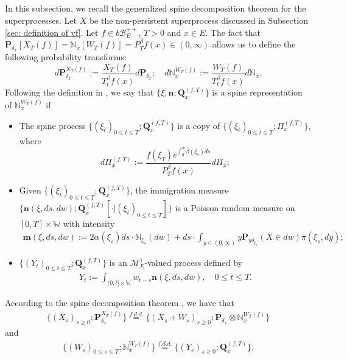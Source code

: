 \documentclass[12pt,oneside,english]{amsart}
\theoremstyle{plain}
\theoremstyle{definition}
\numberwithin{equation}{section}
\newcommand{\added}[1]{{\color{blue}#1}}\newcommand{\deleted}[1]{{\color{red}#1}}
\begin{document}
\subsection{}
    \added{ In this subsection, we recall the generalized spine decomposition theorem for the superprocesses.}
    Let $X$ be the non-persistent superprocess discussed in Subsection \ref{sec: definition of vf}.
    Let $f\in b\mathscr B_E^{++}$, $T >0$ and $x\in E$.
    The fact that $\mathbf P_{\delta_x}[X_T(f)] = \mathbb N_x[W_T(f)] = P^\beta_T f(x) \in (0,\infty)$ allows us to define the following probability transforms:
\begin{equation}
    d\mathbf P_{\delta_x}^{X_T(f)}
    := \frac{X_T(f)}{T_t^\beta f(x)} d\mathbf P_{\delta_x};
    \quad d\mathbb N_x^{W_T(f)}
    :=  \frac{W_T(f)}{T_t^\beta f(x)} d\mathbb N_x.
\end{equation}
    Following the definition in \cite{RenSongSun2017Spine}, we say that $\{\xi, \mathbf n;\mathbf Q_{x}^{(f,T)}\}$ is a spine representation of $\mathbb N_x^{W_T(f)}$ if
\begin{itemize}
\item
    The spine process $\{(\xi_t)_{0\leq t\leq T}; \mathbf Q^{(f,T)}_x\}$ is a copy of $\{(\xi_t)_{0\leq t\leq T}; \Pi^{(f,T)}_{x}\}$,
    where
\begin{equation}
    d\Pi_x^{(f,T)} := \frac{f(\xi_T)e^{\int_0^T \beta(\xi_s)ds}}{P^\beta_T f(x)} d \Pi_x;
\end{equation}
\item
    Given $\{(\xi_t)_{0\leq t\leq T}; \mathbf Q^{(f,T)}_x\}$, the immigration measure $\{\mathbf n(\xi,ds,dw); \mathbf Q^{(f,T)}_x[\cdot |(\xi_t)_{0\leq t\leq T}]\}$ is a Poisson random measure on $[0,T] \times \mathbb W$ with intensity
\begin{align}
    \mathbf m(\xi,ds,dw)
    := 2 \alpha(\xi_s) ds \cdot \mathbb N_{\xi_s}(dw) + ds \cdot \int_{y\in (0,\infty)} y \mathbf P_{y\delta_{\xi_s}}(X\in dw) \pi(\xi_s,dy);
\end{align}
\item
    $\{(Y_t)_{0\leq t\leq T}; \mathbf Q^{(f,T)}_x\}$ is an $\mathcal M^1_E$-valued process defined by
\begin{align}
    Y_t
    := \int_{(0,t] \times \mathbb W} w_{t-s} \mathbf n(\xi,ds,dw),
    \quad 0 \leq t\leq T.
\end{align}
\end{itemize}
    According to the spine decomposition theorem \cite{RenSongSun2017Spine}, we have that
\begin{align}
\label{eq: Spine decomposition 1}
    \{(X_s)_{s \geq 0};\mathbf P_{\delta_x}^{X_T(f)}\}
    \overset{f.d.d.}{=} \{(X_s + W_s)_{s \geq 0};\mathbf P_{\delta_x} \otimes \mathbb N_x^{W_T(f)} \}
\end{align}
    and
\begin{align}
\label{eq: Spine decomposition 2}
    \{(W_s)_{0\leq s\leq T};\mathbb N_x^{W_T(f)}\}
    \overset{f.d.d.}{=} \{(Y_s)_{s \geq 0};\mathbf Q_x^{(f,T)}\}.
\end{align}
\end{document}
